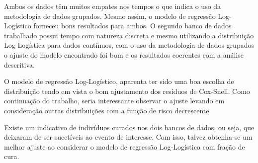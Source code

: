 \documentclass[a4paper,12pt]{article}
\newcommand*\NewPage{\newpage\null\newpage}
\begin{document}
Ambos os dados têm muitos empates nos tempos o que indica o uso da metodologia de dados grupados. Mesmo assim, o modelo de regressão Log-Logístico forneceu bons resultados para ambos. O segundo banco de dados trabalhado possui tempo com natureza discreta e mesmo utilizando a distribuição Log-Logística para dados contínuos, com o uso da metodologia de dados grupados o ajuste do modelo encontrado foi bom e os resultados coerentes com a análise descritiva.

O modelo de regressão Log-Logístico, aparenta ter sido uma boa escolha de distribuição tendo em vista o bom ajustamento dos resíduos de Cox-Snell. Como continuação do trabalho, seria interessante observar o ajuste levando em consideração outras distribuições com a função de risco decrescente.

Existe um indicativo de indivíduos curados nos dois bancos de dados, ou seja, que deixaram de ser sucetíveis ao evento de interesse. Com isso, talvez obtenha-se um melhor ajuste ao considerar o modelo de regressão Log-Logístico com fração de cura.

\NewPage
{}




\nocite{*}
\end{document}
